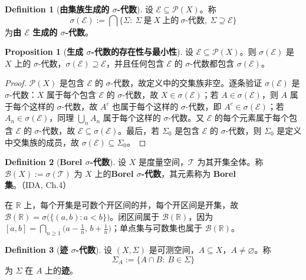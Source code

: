 \documentclass[oneside]{book}
\theoremstyle{definition}
\newcommand{\R}{\mathbb{R}}
\theoremstyle{definition}
\newtheorem{proposition}{Proposition}[section]
\newtheorem{definition}{Definition}[section]
\begin{document}
	\begin{definition}[\bfseries{由集族生成的 $\sigma$-代数}]
		设 $\mathcal{E}\subseteq\mathcal{P}(X)$。称
		\[
		\sigma(\mathcal{E}):=\bigcap\bigl\{\Sigma:\ \Sigma\ \text{是}\ X\ \text{上的}\ \sigma\text{-代数},\ \Sigma\supseteq\mathcal{E}\bigr\}
		\]
		为\textbf{由 $\mathcal{E}$ 生成的 $\sigma$-代数}。
	\end{definition}
	
	\begin{proposition}[\bfseries{生成 $\sigma$-代数的存在性与最小性}]
		设 $\mathcal{E}\subseteq\mathcal{P}(X)$。则 $\sigma(\mathcal{E})$ 是 $X$ 上的 $\sigma$-代数，$\sigma(\mathcal{E})\supseteq\mathcal{E}$，并且任何包含 $\mathcal{E}$ 的 $\sigma$-代数都包含 $\sigma(\mathcal{E})$。
	\end{proposition}
	
	\begin{proof}
		$\mathcal{P}(X)$ 是包含 $\mathcal{E}$ 的 $\sigma$-代数，故定义中的交集族非空。逐条验证 $\sigma(\mathcal{E})$ 是 $\sigma$-代数：$X$ 属于每个包含 $\mathcal{E}$ 的 $\sigma$-代数，故 $X\in\sigma(\mathcal{E})$；若 $A\in\sigma(\mathcal{E})$，则 $A$ 属于每个这样的 $\sigma$-代数，故 $A^{c}$ 也属于每个这样的 $\sigma$-代数，即 $A^{c}\in\sigma(\mathcal{E})$；若 $A_n\in\sigma(\mathcal{E})$，同理 $\bigcup_n A_n$ 属于每个这样的 $\sigma$-代数。又 $\mathcal{E}$ 的每个元素属于每个包含 $\mathcal{E}$ 的 $\sigma$-代数，故 $\mathcal{E}\subseteq\sigma(\mathcal{E})$。最后，若 $\Sigma_0$ 是包含 $\mathcal{E}$ 的 $\sigma$-代数，则 $\Sigma_0$ 是定义中交集族的成员，故 $\sigma(\mathcal{E})\subseteq\Sigma_0$。
	\end{proof}
	
	\begin{definition}[\bfseries{Borel $\sigma$-代数}]
		设 $X$ 是度量空间，$\mathcal{T}$ 为其开集全体。称 $\mathcal{B}(X):=\sigma(\mathcal{T})$ 为 $X$ 上的\textbf{Borel $\sigma$-代数}，其元素称为 \textbf{Borel 集}。（IDA, Ch.4）
	\end{definition}
	
	在 $\R$ 上，每个开集是可数个开区间的并，每个开区间是开集，故 $\mathcal{B}(\R)=\sigma\bigl(\{(a,b):a<b\}\bigr)$。闭区间属于 $\mathcal{B}(\R)$，因为 $[a,b]=\bigcap_{n\geqslant1}\bigl(a-\tfrac1n,\,b+\tfrac1n\bigr)$；单点集与可数集也属于 $\mathcal{B}(\R)$。
	
	\begin{definition}[\bfseries{迹 $\sigma$-代数}]
		设 $(X,\Sigma)$ 是可测空间，$A\subseteq X$，$A\neq\varnothing$。称
		\[
		\Sigma_A:=\{A\cap B:\ B\in\Sigma\}
		\]
		为 $\Sigma$ 在 $A$ 上的\textbf{迹}。
	\end{definition}
	
\end{document}
